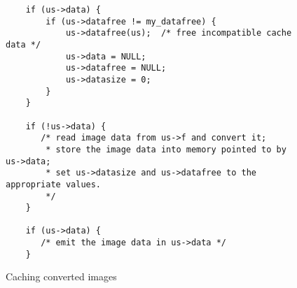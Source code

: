 \begin{figure}[hbt]
\begin{verbatim}
    if (us->data) {
        if (us->datafree != my_datafree) {
            us->datafree(us);  /* free incompatible cache data */
            us->data = NULL;
            us->datafree = NULL;
            us->datasize = 0;
        }
    }

    if (!us->data) { 
       /* read image data from us->f and convert it;
        * store the image data into memory pointed to by us->data;
        * set us->datasize and us->datafree to the appropriate values.
        */
    }

    if (us->data) {
       /* emit the image data in us->data */
    }
\end{verbatim}
\caption{Caching converted images}
\label{fig:caching}
\end{figure}

